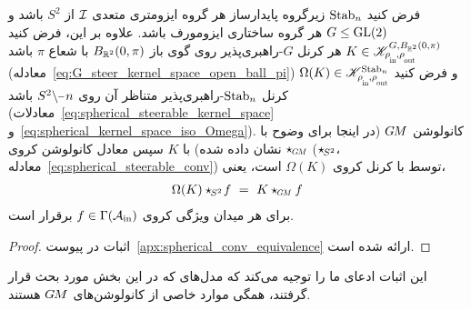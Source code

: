 \begin{thm}
	\label{thm:spherical_conv_GM_conv}
	فرض کنید $\operatorname{Stab}_{n}$ زیرگروه پایدارساز هر گروه ایزومتری متعدی $\mathcal{I}$ از $S^2$ باشد و $G \leq \operatorname{GL}(2)$ هر گروه ساختاری ایزومورف باشد.
	علاوه بر این، فرض کنید $K \in \mathscr{K}^{G,B_{\R^2}(0,\pi)}_{\rhoin\mkern-1mu,\rhoout}$ هر کرنل $G$-راهبری‌پذیر روی گوی باز $B_{\mathbb{R}^2}(0,\pi)$ با شعاع $\pi$ باشد (معادله~\eqref{eq:G_steer_kernel_space_open_ball_pi})
	و فرض کنید $\Omega(K) \in \mathscr{K}^{\Stab{n}}_{\rhoin\mkern-1mu,\rhoout}$ کرنل $\operatorname{Stab}_{n}$-راهبری‌پذیر متناظر آن روی $S^2\backslash \mkern-1mu\minus\mkern1mu n$ باشد (معادلات~\eqref{eq:spherical_steerable_kernel_space} و~\eqref{eq:spherical_kernel_space_iso_Omega}).
	کانولوشن $G\mkern-1.4muM$ (در اینجا برای وضوح با $\star_{\mkern-1mu\scalebox{.64}{$\GM$}}$ نشان داده شده) با $K$ سپس معادل کانولوشن کروی ($\star_{\mkern-2mu S^2}$، معادله~\eqref{eq:spherical_steerable_conv}) توسط \citet{Cohen2018-intertwiners} با کرنل کروی $\Omega(K)$ است، یعنی،
	\begin{align}
		\Omega(K) \star_{\mkern-2mu S^2}\! f\ =\ K \star_{\mkern-1mu\scalebox{.64}{$\GM$}} f
	\end{align}
	برای هر میدان ویژگی کروی $f \in \Gamma(\mathcal{A}_\textup{in})$ برقرار است.
\end{thm}
\begin{proof}
	اثبات در پیوست~\ref{apx:spherical_conv_equivalence} ارائه شده است.
\end{proof}
این اثبات ادعای ما را توجیه می‌کند که مدل‌های \cite{Cohen2018-S2CNN,esteves2018zonalSpherical,esteves2020spinweighted,kondor2018ClebschGordan} که در این بخش مورد بحث قرار گرفتند، همگی موارد خاصی از کانولوشن‌های $G\mkern-1.4muM$ هستند.